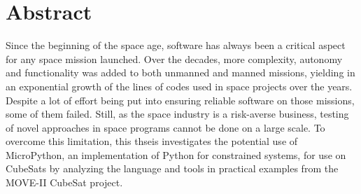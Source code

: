 \cleardoublepage
\section*{Abstract}

Since the beginning of the space age, software has always been a critical aspect for any space mission launched. Over the decades, more complexity, autonomy and functionality was added to both unmanned and manned missions, yielding in an exponential growth of the lines of codes used in space projects over the years. Despite a lot of effort being put into ensuring reliable software on those missions, some of them failed. Still, as the space industry is a risk-averse business, testing of novel approaches in space programs cannot be done on a large scale. To overcome this limitation, this thseis investigates the potential use of MicroPython, an implementation of Python for constrained systems, for use on CubeSats by analyzing the language and tools in practical examples from the MOVE-II CubeSat project.
